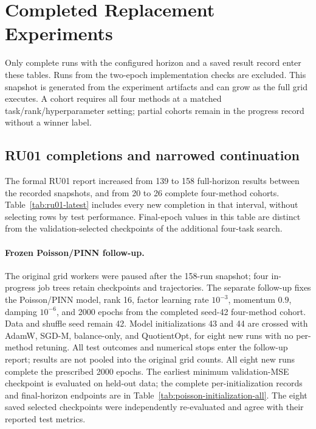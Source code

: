 


















\FloatBarrier
\section{Completed Replacement Experiments}
\label{app:new-results}
Only complete runs with the configured horizon and a saved result record enter these tables. Runs from the two-epoch implementation checks are excluded. This snapshot is generated from the experiment artifacts and can grow as the full grid executes. A cohort requires all four methods at a matched task/rank/hyperparameter setting; partial cohorts remain in the progress record without a winner label.

\subsection{RU01 completions and narrowed continuation}
The formal RU01 report increased from 139 to 158 full-horizon results
between the recorded snapshots, and from 20 to 26 complete four-method
cohorts. Table~\ref{tab:ru01-latest} includes every new completion in
that interval, without selecting rows by test performance. Final-epoch
values in this table are distinct from the validation-selected
checkpoints of the additional four-task search.

\paragraph{Frozen Poisson/PINN follow-up.}
The original grid workers were paused after the 158-run snapshot; four
in-progress job trees retain checkpoints and trajectories. The separate
follow-up fixes the Poisson/PINN model, rank 16, factor learning rate
$10^{-3}$, momentum $0.9$, damping $10^{-6}$, and 2000 epochs from
the completed seed-42 four-method cohort. Data and shuffle seed remain
42. Model initializations 43 and 44 are crossed with AdamW, SGD-M,
balance-only, and QuotientOpt, for eight new runs with no per-method
retuning. All test outcomes and numerical stops enter the follow-up
report; results are not pooled into the original grid counts. All eight
new runs complete the prescribed 2000 epochs. The earliest minimum
validation-MSE checkpoint is evaluated on held-out data; the complete
per-initialization records and final-horizon endpoints are in
Table~\ref{tab:poisson-initialization-all}. The eight saved selected
checkpoints were independently re-evaluated and agree with their
reported test metrics.

